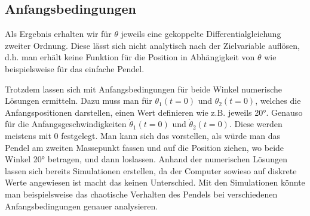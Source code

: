 \subsection{Anfangsbedingungen}
Als Ergebnis erhalten wir für \(\theta\) jeweils eine gekoppelte Differentialgleichung zweiter Ordnung.
Diese lässt sich nicht analytisch nach der Zielvariable auflösen,
d.h. man erhält keine Funktion für die Position in Abhängigkeit von \(\theta\) 
wie beispielsweise für das einfache Pendel.

Trotzdem lassen sich mit Anfangsbedingungen für beide Winkel numerische Lösungen ermitteln.
Dazu muss man für \(\theta_1(t=0)\) und \(\theta_2(t=0)\), welches die Anfangspositionen darstellen,
einen Wert definieren wie z.B. jeweils 20°. Genauso für die Anfangsgeschwindigkeiten \(\dot{\theta}_1(t=0)\)
und \(\dot{\theta}_2(t=0)\).
Diese werden meistens mit 0 festgelegt. Man kann sich das vorstellen, als würde man das Pendel
am zweiten Massepunkt fassen und auf die Position ziehen, wo beide Winkel 20° betragen, und dann loslassen.
Anhand der numerischen Lösungen lassen sich bereits Simulationen erstellen, da der Computer
sowieso auf diskrete Werte angewiesen ist macht das keinen Unterschied.
Mit den Simulationen könnte man beispielsweise das chaotische Verhalten des Pendels bei verschiedenen 
Anfangsbedingungen genauer analysieren.

